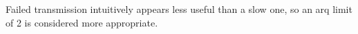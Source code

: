Failed transmission intuitively appears less useful than a slow one, so an \gls{arq} limit of 2 is considered more appropriate.
